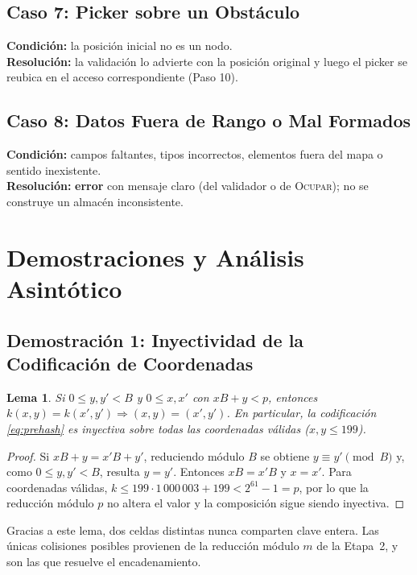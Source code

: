 \documentclass[11pt,a4paper]{article}
\newtheorem{lema}{Lema}
\theoremstyle{definition}
\begin{document}
\subsection{Caso 7: Picker sobre un Obstáculo}
\textbf{Condición:} la posición inicial no es un nodo.\\
\textbf{Resolución:} la validación lo advierte con la posición original y luego el picker se reubica en el acceso correspondiente (Paso 10).

\subsection{Caso 8: Datos Fuera de Rango o Mal Formados}
\textbf{Condición:} campos faltantes, tipos incorrectos, elementos fuera del mapa o sentido inexistente.\\
\textbf{Resolución:} \textbf{error} con mensaje claro (del validador o de \textsc{Ocupar}); no se construye un almacén inconsistente.

\section{Demostraciones y Análisis Asintótico}

\subsection{Demostración 1: Inyectividad de la Codificación de Coordenadas}

\begin{lema}\label{lema:prehash}
Si $0\le y,y'<B$ y $0\le x,x'$ con $xB+y<p$, entonces $k(x,y)=k(x',y')\Rightarrow(x,y)=(x',y')$. En particular, la codificación \eqref{eq:prehash} es inyectiva sobre todas las coordenadas válidas ($x,y\le199$).
\end{lema}
\begin{proof}
Si $xB+y=x'B+y'$, reduciendo módulo $B$ se obtiene $y\equiv y'\pmod B$ y, como $0\le y,y'<B$, resulta $y=y'$. Entonces $xB=x'B$ y $x=x'$. Para coordenadas válidas, $k\le199\cdot1\,000\,003+199<2^{61}-1=p$, por lo que la reducción módulo $p$ no altera el valor y la composición sigue siendo inyectiva.
\end{proof}

Gracias a este lema, dos celdas distintas nunca comparten clave entera. Las únicas colisiones posibles provienen de la reducción módulo $m$ de la Etapa~2, y son las que resuelve el encadenamiento.
\end{document}
